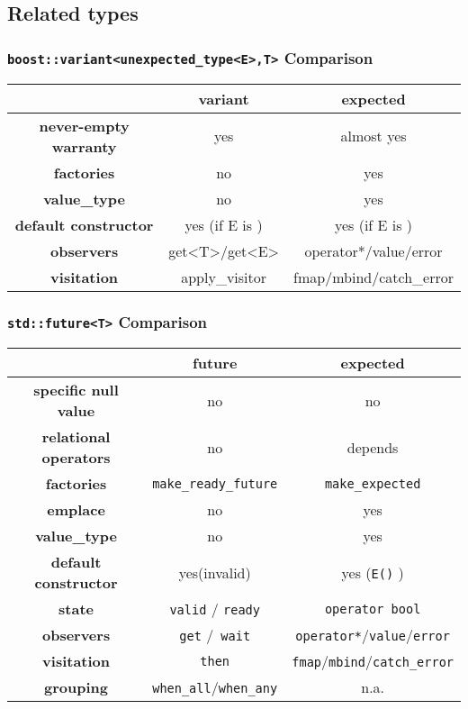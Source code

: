 \documentclass[xcolor=dvipsnames]{beamer}
\newcommand{\cpp}[1]{\lstinline{#1}}
\begin{document}
\subsection{Related types}

\begin{frame}[fragile]
\frametitle{\cpp{boost::variant<unexpected_type<E>,T>} Comparison}

\begin{tabular}{|c|c|c|}
\hline
                    & \textbf{variant} & \textbf{expected}  \\
\hline
\textbf{never-empty warranty} & yes & almost yes \\
\hline
\textbf{factories} & no & yes  \\
\hline
\textbf{value\_type} & no & yes  \\
\hline
\textbf{default constructor} & yes (if E is ) & yes (if E is )  \\
\hline
\textbf{observers} & get<T>/get<E> & operator*/value/error   \\
\hline
\textbf{visitation} & apply\_visitor & fmap/mbind/catch\_error  \\
\hline
\end{tabular}
\end{frame}

\begin{frame}[fragile]
\frametitle{\cpp{std::future<T>} Comparison}

\begin{tabular}{|c|c|c|}
\hline
                    & \textbf{future} & \textbf{expected}  \\
\hline
\textbf{specific null value} & no & no \\
\hline
\textbf{relational operators} & no & depends \\
\hline
\textbf{factories} & \cpp{make_ready_future} & \cpp{make_expected}  \\
\hline
\textbf{emplace} & no & yes \\
\hline
\textbf{value\_type} & no & yes  \\
\hline
\textbf{default constructor} & yes(invalid) & yes (\cpp{E()} )  \\
\hline
\textbf{state} & \cpp{valid} / \cpp{ready} & \cpp{operator bool}   \\
\hline
\textbf{observers} & \cpp{get} /\cpp{ wait} & \cpp{operator*}/\cpp{value}/\cpp{error}   \\
\hline
\textbf{visitation} & \cpp{then} & \cpp{fmap}/\cpp{mbind}/\cpp{catch_error}  \\
\hline
\textbf{grouping}  &  \cpp{when_all}/\cpp{when_any} &  n.a. \\
\hline
\end{tabular}
\end{frame}
\end{document}
